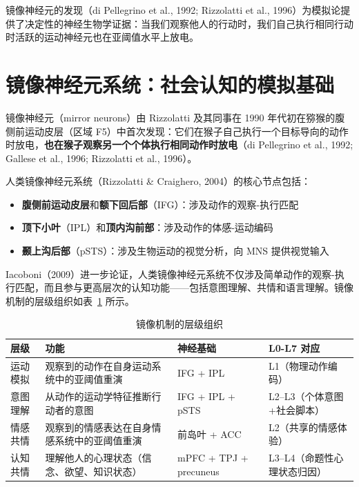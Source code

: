 \documentclass[UTF8,12pt,a4paper]{ctexart}
\begin{document}
镜像神经元的发现（di Pellegrino et al., 1992; Rizzolatti et al., 1996）为模拟论提供了决定性的神经生物学证据：当我们观察他人的行动时，我们自己执行相同行动时活跃的运动神经元也在亚阈值水平上放电。

\section{镜像神经元系统：社会认知的模拟基础}

镜像神经元（mirror neurons）由 Rizzolatti 及其同事在 1990 年代初在猕猴的腹侧前运动皮层（区域 F5）中首次发现：它们在猴子自己执行一个目标导向的动作时放电，\textbf{也在猴子观察另一个个体执行相同动作时放电}（di Pellegrino et al., 1992; Gallese et al., 1996; Rizzolatti et al., 1996）。

人类镜像神经元系统（Rizzolatti \& Craighero, 2004）的核心节点包括：
\begin{itemize}[nosep]
    \item \textbf{腹侧前运动皮层}和\textbf{额下回后部}（IFG）：涉及动作的观察-执行匹配
    \item \textbf{顶下小叶}（IPL）和\textbf{顶内沟前部}：涉及动作的体感-运动编码
    \item \textbf{颞上沟后部}（pSTS）：涉及生物运动的视觉分析，向 MNS 提供视觉输入
\end{itemize}

Iacoboni（2009）进一步论证，人类镜像神经元系统不仅涉及简单动作的观察-执行匹配，而且参与更高层次的认知功能——包括意图理解、共情和语言理解。镜像机制的层级组织如表~\ref{tab:mirror-hierarchy} 所示。

\begin{table}[h]
\centering
\caption{镜像机制的层级组织}
\label{tab:mirror-hierarchy}
\begin{tabular}{p{2.5cm}p{5cm}p{3cm}p{2.5cm}}
\toprule
\textbf{层级} & \textbf{功能} & \textbf{神经基础} & \textbf{L0-L7 对应} \\
\midrule
运动模拟 & 观察到的动作在自身运动系统中的亚阈值重演 & IFG + IPL & L1（物理动作编码） \\
意图理解 & 从动作的运动学特征推断行动者的意图 & IFG + IPL + pSTS & L2--L3（个体意图+社会脚本） \\
情感共情 & 观察到的情感表达在自身情感系统中的亚阈值重演 & 前岛叶 + ACC & L2（共享的情感体验） \\
认知共情 & 理解他人的心理状态（信念、欲望、知识状态） & mPFC + TPJ + precuneus & L3--L4（命题性心理状态归因） \\
\bottomrule
\end{tabular}
\end{table}
\end{document}
